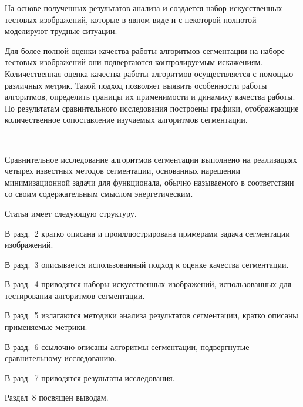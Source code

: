 \begin{multicols}{2}
На основе полученных результатов анализа и 
создается набор искусственных тестовых изображений, которые в явном виде и 
с некоторой полнотой моделируют трудные ситуации.
  
  Для более полной оценки качества работы алгоритмов сегментации на наборе 
тестовых изображений они подвергаются контролируемым искажениям. 
Количественная оценка качества работы алгоритмов осуществляется с 
помощью различных метрик. Такой подход позволяет выявить особенности 
работы алгоритмов, определить границы их применимости и динамику качества 
работы. По результатам сравнительного исследования построены графики, 
отображающие количественное со\-по\-став\-ле\-ние изучаемых алгоритмов 
сегментации.

\begin{figure*}[b] %
\vspace*{-7pt}
\begin{center}
\mbox{%
\epsfxsize=162.622mm
}
\end{center}
\vspace*{-9pt}
\end{figure*}
  
  Сравнительное исследование алгоритмов сегментации выполнено на 
реализациях четырех известных методов сегментации, основанных на\linebreak решении 
минимизационной задачи для функционала, обычно называемого в 
соответствии со своим содержательным смыслом энергетическим.
  
  Статья имеет следующую структуру.
  
  В разд.~2 кратко описана и проиллюстрирована примерами задача 
сегментации изображений.
  
  В разд.~3 описывается использованный подход к оценке качества 
сегментации.
  
  В разд.~4 приводятся наборы искусственных изоб\-ра\-же\-ний, использованных 
для тестирования алгоритмов сегментации.
  
  В разд.~5 излагаются методики анализа результатов сегментации, кратко 
описаны применяемые метрики.
  
  В разд.~6 ссылочно описаны алгоритмы сегментации, подвергнутые 
сравнительному исследованию.
  
  В разд.~7 приводятся результаты исследования.
  
  Раздел~8 посвящен выводам.
  

\end{multicols}

